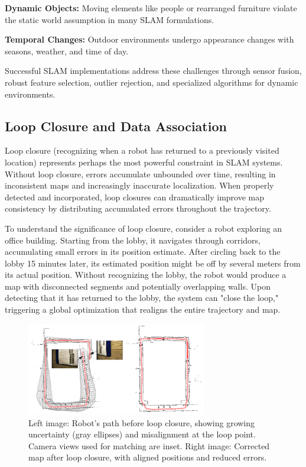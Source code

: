 \documentclass[12pt]{article}
\begin{document}
    \textbf{Dynamic Objects:} Moving elements like people or rearranged furniture violate the static world assumption in many SLAM formulations.
    
    \textbf{Temporal Changes:} Outdoor environments undergo appearance changes with seasons, weather, and time of day.
    
    Successful SLAM implementations address these challenges through sensor fusion, robust feature selection, outlier rejection, and specialized algorithms for dynamic environments.
    
    \subsection{Loop Closure and Data Association}
    Loop closure (recognizing when a robot has returned to a previously visited location) represents perhaps the most powerful constraint in SLAM systems. 
    Without loop closure, errors accumulate unbounded over time, resulting in inconsistent maps and increasingly inaccurate localization. 
    When properly detected and incorporated, loop closures can dramatically improve map consistency by distributing accumulated errors throughout the trajectory.
    
    To understand the significance of loop closure, consider a robot exploring an office building. Starting from the lobby, it navigates through corridors, accumulating small errors in its position 
    estimate. After circling back to the lobby 15 minutes later, its estimated position might be off by several meters from its actual position. Without recognizing the lobby, the robot would produce a map 
    with disconnected segments and potentially overlapping walls. Upon detecting that it has returned to the lobby, the system can "close the loop," triggering a global optimization that realigns the 
    entire trajectory and map.

    \begin{figure}[h!]
        \centering
        \includegraphics[width=0.7\textwidth]{loop_closure_2.png}
        \caption{Left image: Robot's path before loop closure, showing growing uncertainty (gray ellipses) and misalignment at the loop point. Camera views used for matching are inset. 
                Right image: Corrected map after loop closure, with aligned positions and reduced errors. \cite{loop_closure_2_img}}
        \label{fig:loop_closure_2}
    \end{figure}
\end{document}
